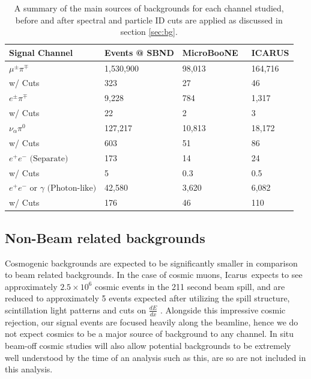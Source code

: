 \documentclass[11pt, a4paper]{article}
\def\muboone{MicroBooNE}
\def\icarus{Icarus}
\begin{document}
\begin{table}[t]
\centering
\begin{tabular}{ l | l |  l | l |  }
	Signal Channel & Events @ SBND & \muboone\ & ICARUS \\
\hline\hline
$\mu^\pm \pi^\mp$ &  1,530,900  & 98,013 & 164,716\\
													  w/ Cuts &323 & 27 & 46 \\ \hline
$ e^\pm \pi^\mp$ &  9,228  & 784 & 1,317\\
													  w/ Cuts &22 & 2 & 3 \\ \hline
$ \nu_\alpha \pi^0$ &   127,217 & 10,813 & 18,172\\
													  w/ Cuts &603 & 51 & 86 \\ \hline
$ e^+e^- \text{ (Separate)} $ & 173 & 14 & 24\\
													  w/ Cuts &5 & 0.3 & 0.5\\ \hline
$ e^+ e^- \text{ or } \gamma \text{ (Photon-like)}$ &  42,580 & 3,620 & 6,082\\
													  w/ Cuts &176 & 46 & 110 \\ 
 \hline \hline

\end{tabular}

\caption{\label{tab:Rates} A summary of the main sources of backgrounds for
each channel studied, before and after spectral and particle ID cuts are
applied as discussed in section \ref{sec:bg}. }

\end{table}


\subsection{Non-Beam related backgrounds}

Cosmogenic backgrounds are expected to be significantly smaller in comparison
to beam related backgrounds. In the case of cosmic muons, \icarus\ expects to
see approximately $2.5 \times 10^{6}$ cosmic events in the 211 second beam
spill, and are reduced to approximately 5 events expected after utilizing the
spill structure, scintillation light patterns and cuts on $\frac{d E}{d x}$
\cite{Antonello:2015lea}.  Alongside this impressive cosmic rejection, our
signal events are focused heavily along the beamline, hence we do not expect
cosmics to be a major source of background to any channel. In situ beam-off
cosmic studies will also allow potential backgrounds to be extremely well
understood by the time of an analysis such as this, are so are not included in
this analysis. 
\end{document}

